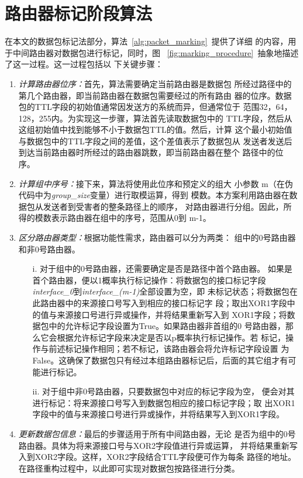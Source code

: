 \section{路由器标记阶段算法}

在本文的数据包标记法部分，算法~\ref{alg:packet_marking}~提供了详细
的内容，用于中间路由器对数据包进行标记，同时，图
~\ref*{fig:marking_procedure}~抽象地描述了这一过程。这一过程包括以
下关键步骤：



\begin{enumerate}[label=(\alph*).]
  \item \emph{计算路由器位序：}首先，算法需要确定当前路由器是数据包
  所经过路径中的第几个路由器，即当前路由器在数据包需要经过的所有路由
  器的位序。数据包的TTL字段的初始值通常因发送方的系统而异，但通常位于
  范围{32，64，128，255}内。为实现这一步骤，算法首先读取数据包中的
  TTL字段，然后从这组初始值中找到能够不小于数据包TTL的值。然后，计算
  这个最小初始值与数据包中的TTL字段之间的差值，这个差值表示了数据包从
  发送者发送后到达当前路由器时所经过的路由器跳数，即当前路由器在整个
  路径中的位序。
  \item \emph{计算组中序号：}接下来，算法将使用此位序和预定义的组大
  小参数 m（在伪代码中为\emph{group\_size}变量）进行取模运算，得到
  模数。本方案利用路由器在数据包从发送者到受害者的整条路径上的顺序，
  对路由器进行分组。因此，所得的模数表示路由器在组中的序号，范围从0到
  m-1。
  \item \emph{区分路由器类型：}根据功能性需求，路由器可以分为两类：
  组中的0号路由器和非0号路由器。
  \begin{enumerate}
    \item[i.] 对于组中的0号路由器，还需要确定是否是路径中首个路由器。
    如果是首个路由器，便以1概率执行标记操作：将数据包的接口标记字段
    \emph{interface\_0}到\emph{interface\_(m-1)}全部设置为空，即
    未标记状态；将数据包在此路由器中的来源接口号写入到相应的接口标记字
    段；取出XOR1字段中的值与来源接口号进行异或操作，并将结果重新写入到
    XOR1字段；将数据包中的允许标记字段设置为True。如果路由器非首组的0
    号路由器，那么它会根据允许标记字段来决定是否以p概率执行标记操作。若
    标记，操作与前述标记操作相同；若不标记，该路由器会将允许标记字段设置
    为False。这确保了数据包只有经过本组路由器标记后，后面的其它组才有可
    能进行标记。
    \item[ii.] 对于组中非0号路由器，只要数据包中对应的标记字段为空，
    便会对其进行标记：将来源接口号写入到数据包相应的接口标记字段；取
    出XOR1字段中的值与来源接口号进行异或操作，并将结果写入到XOR1字段。
  \end{enumerate}
  \item \emph{更新数据包信息：}最后的步骤适用于所有中间路由器，无论
  是否为组中的0号路由器。具体为将来源接口号与XOR2字段值进行异或运算，
  并将结果重新写入到XOR2字段。这样，XOR2字段结合TTL字段便可作为每条
  路径的地址。在路径重构过程中，以此即可实现对数据包按路径进行分类。
\end{enumerate}

